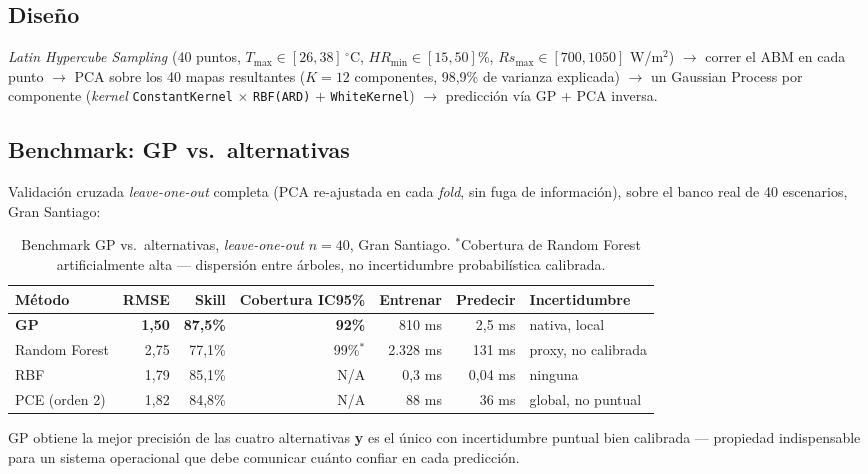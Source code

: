 \documentclass[11pt,a4paper]{article}
\begin{document}
\subsection{Diseño}

\emph{Latin Hypercube Sampling} (40 puntos, $T_{\max} \in [26,38]\,^\circ$C,
$HR_{\min} \in [15,50]$\%, $Rs_{\max} \in [700,1050]$ W/m$^2$) $\to$ correr
el ABM en cada punto $\to$ PCA sobre los 40 mapas resultantes ($K=12$
componentes, 98,9\% de varianza explicada) $\to$ un Gaussian Process por
componente (\emph{kernel} \texttt{ConstantKernel} $\times$ \texttt{RBF(ARD)}
$+$ \texttt{WhiteKernel}) $\to$ predicción vía GP + PCA inversa.

\subsection{Benchmark: GP vs.\ alternativas}

Validación cruzada \emph{leave-one-out} completa (PCA re-ajustada en cada
\emph{fold}, sin fuga de información), sobre el banco real de 40 escenarios,
Gran Santiago:

\begin{table}[h]
\centering
\begin{tabular}{lrrrrrl}
\toprule
Método & RMSE & Skill & Cobertura IC95\% & Entrenar & Predecir & Incertidumbre \\
\midrule
\textbf{GP} & \textbf{1,50} & \textbf{87,5\%} & \textbf{92\%} & 810 ms & 2,5 ms & nativa, local \\
Random Forest & 2,75 & 77,1\% & 99\%$^*$ & 2.328 ms & 131 ms & proxy, no calibrada \\
RBF & 1,79 & 85,1\% & N/A & 0,3 ms & 0,04 ms & ninguna \\
PCE (orden 2) & 1,82 & 84,8\% & N/A & 88 ms & 36 ms & global, no puntual \\
\bottomrule
\end{tabular}
\caption{Benchmark GP vs.\ alternativas, \emph{leave-one-out} $n=40$, Gran
Santiago. $^*$Cobertura de Random Forest artificialmente alta --- dispersión
entre árboles, no incertidumbre probabilística calibrada.}
\label{tab:benchmark}
\end{table}

GP obtiene la mejor precisión de las cuatro alternativas \textbf{y} es el
único con incertidumbre puntual bien calibrada --- propiedad indispensable
para un sistema operacional que debe comunicar cuánto confiar en cada
predicción.

\end{document}
